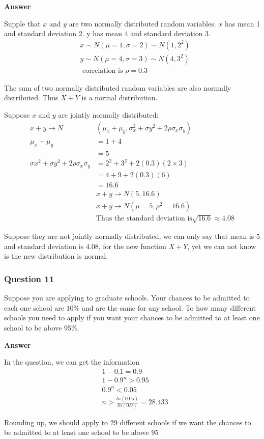\documentclass[margin=1in]{article}
\begin{document}
		   \textbf{Answer}
		   
		   Supple that $x$ and $y$ are two normally distributed random variables. $x$ has mean 1 and standard deviation 2. y has mean 4 and standard deviation 3.
		   $$
		   \begin{aligned}
		   	& x \sim N(\mu=1, \sigma=2) \sim N\left(1,2^2\right) \\
		   	& y \sim N(\mu=4, \sigma=3) \sim N\left(4,3^2\right) \\
		   	& \text { correlation is } \rho=0.3
		   \end{aligned}
		   $$
		   
		   The sum of two normally distributed random variables are also normally distributed. Thus $X+Y$ is a normal distribution.
		   
		   Suppose $x$ and $y$ are jointly normally distributed:
		   $$
		   \begin{aligned}
		   	x+y \longrightarrow N & \left(\mu_x+\mu_y, \sigma_x^2+\sigma y^2+2 \rho \sigma_x \sigma_y\right) \\
		   	\mu_x+\mu_y & =1+4 \\
		   	& =5 \\
		   	\sigma x^2+\sigma y^2+2 \rho \sigma_x \sigma_y & =2^2+3^2+2(0.3)(2 \times 3) \\
		   	& =4+9+2(0.3)(6) \\
		   	& =16.6\\
		   	& x+y \rightarrow N(5,16.6) \\
		   	& x+y \rightarrow N\left(\mu=5, \rho^2=16.6\right) \\
		   	& \text{Thus the standard deviation is} \sqrt{16.6} \approx 4.08
		\end{aligned}
	$$
		   
		   Suppose they are not jointly normally distributed, we can only say that mean is 5 and standard deviation is 4.08, for the new function $X+Y$, yet we can not know is the new distribution is normal.
		   
		   	
		   \subsubsection*{Question 11}
		   Suppose you are applying to graduate schools. Your chances to be admitted to each one school are $10 \%$ and are the same for any school. To how many different schools you need to apply if you want your chances to be admitted to at least one school to be above 95\%.
		   
		   \textbf{Answer}
		   
		   In the question, we can get the information
		   $$
		   \begin{aligned}
		   	& 1-0.1=0.9\\
		   	& 1-0.9^{n}>0.95\\
		   	& 0.9^{n}<0.05\\
		   	& n>\frac{ln(0.05)}{ln(0.9)}=28.433
		   \end{aligned}
	   $$
	   
	   Rounding up, we should apply to 29 different schools  if we want the chances to be admitted to at least one school to be above 95%
		
		
	\pagebreak
	 
	
\end{document}
